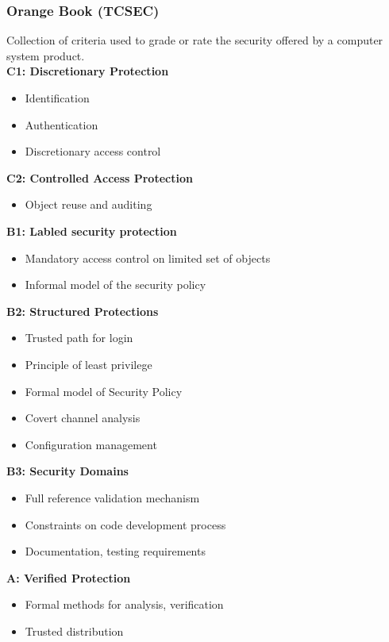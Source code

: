\subsubsection{Orange Book (TCSEC)}
Collection of criteria used to grade or rate the security offered by a computer system product.\\
\textbf{C1: Discretionary Protection}
\begin{itemize}
    \item Identification
    \item Authentication
    \item Discretionary access control
\end{itemize}
\textbf{C2: Controlled Access Protection}
\begin{itemize}
    \item Object reuse and auditing
\end{itemize}
\textbf{B1: Labled security protection}
\begin{itemize}
    \item Mandatory access control on limited set of objects
    \item Informal model of the security policy
\end{itemize}
\textbf{B2: Structured Protections}
\begin{itemize}
    \item Trusted path for login
    \item Principle of least privilege
    \item Formal model of Security Policy
    \item Covert channel analysis
    \item Configuration management
\end{itemize}
\textbf{B3: Security Domains}
\begin{itemize}
    \item Full reference validation mechanism
    \item Constraints on code development process
    \item Documentation, testing requirements
\end{itemize}
\textbf{A: Verified Protection}
\begin{itemize}
    \item Formal methods for analysis, verification
    \item Trusted distribution
\end{itemize}

